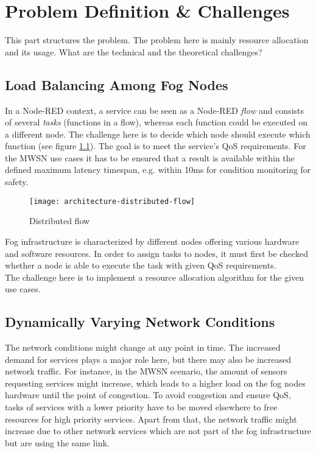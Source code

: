 \chapter{Problem Definition \& Challenges\label{cha:problem-definition}}
This part structures the problem. The problem here is mainly resource allocation and its usage. What are the technical and the theoretical challenges?

\section{Load Balancing Among Fog Nodes}
In a Node-RED context, a service can be seen as a Node-RED \textit{flow} and consists of several \textit{tasks} (functions in a flow), whereas each function could be executed on a different node.
The challenge here is to decide which node should execute which function (see figure \ref{fig:distributed-flow}).
The goal is to meet the service's QoS requirements.
For the MWSN use cases it has to be ensured that a result is available within the defined maximum latency timespan, e.g. within 10ms for condition monitoring for safety.\\

\begin{figure}
    \centering
    \texttt{[image: architecture-distributed-flow]}
    \caption{Distributed flow}
    \label{fig:distributed-flow}
\end{figure}

Fog infrastructure is characterized by different nodes offering various hardware and software resources.
In order to assign tasks to nodes, it must first be checked whether a node is able to execute the task with given QoS requirements.\\

The challenge here is to implement a resource allocation algorithm for the given use cases.


\section{Dynamically Varying Network Conditions}
The network conditions might change at any point in time.
The increased demand for services plays a major role here, but there may also be increased network traffic.
For instance, in the MWSN scenario, the amount of sensors requesting services might increase, which leads to a higher load on the fog nodes hardware until the point of congestion.
To avoid congestion and ensure QoS, tasks of services with a lower priority have to be moved elsewhere to free resources for high priority services.
Apart from that, the network traffic might increase due to other network services which are not part of the fog infrastructure but are using the same link.\\

